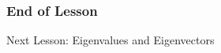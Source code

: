 \documentclass[xcolor=dvipsnames]{beamer}
\begin{document}


\begin{frame}
  \frametitle{End of Lesson}
Next Lesson: Eigenvalues and Eigenvectors
\end{frame}
\end{document}
